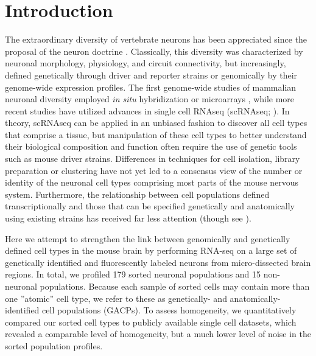 \section*{Introduction}

The extraordinary diversity of vertebrate neurons has been appreciated since the proposal of the neuron doctrine \citep{Cajal_1888}. Classically, this diversity was characterized by neuronal morphology, physiology, and circuit connectivity, but increasingly, defined genetically through driver and reporter strains \cite{Gong_2003, Madisen_2009, Taniguchi_2011, Shima_2016} or genomically by their genome-wide expression profiles. The first genome-wide studies of mammalian neuronal diversity employed \textit{in situ} hybridization \citep{Lein_2006} or microarrays \cite{Sugino_2005, Doyle_2008}, while more recent studies have utilized advances in single cell RNAseq (scRNAseq; \citealt{Zeisel_2015, Zeisel_2018, Tasic_2016, Tasic_2018, Paul_2017}). In theory, scRNAseq can be applied in an unbiased fashion to discover all cell types that comprise a tissue, but manipulation of these cell types to better understand their biological composition and function often require the use of genetic tools such as mouse driver strains. Differences in techniques for cell isolation, library preparation or clustering have not yet led to a consensus view of the number or identity of the neuronal cell types comprising most parts of the mouse nervous system. Furthermore, the relationship between cell populations defined transcriptionally and those that can be specified genetically and anatomically using existing strains has received far less attention (though see \citealt{Tasic_2018}).    
 
Here we attempt to strengthen the link between genomically and genetically defined cell types in the mouse brain by performing RNA-seq on a large set of genetically identified and fluorescently labeled neurons from micro-dissected brain regions. In total, we profiled 179 sorted neuronal populations and 15 non-neuronal populations. Because each sample of sorted cells may contain more than one ”atomic” cell type, we refer to these as genetically- and anatomically-identified cell populations (GACPs). To assess homogeneity, we quantitatively compared our sorted cell types to publicly available single cell datasets, which revealed a comparable level of homogeneity, but a much lower level of noise in the sorted population profiles.

